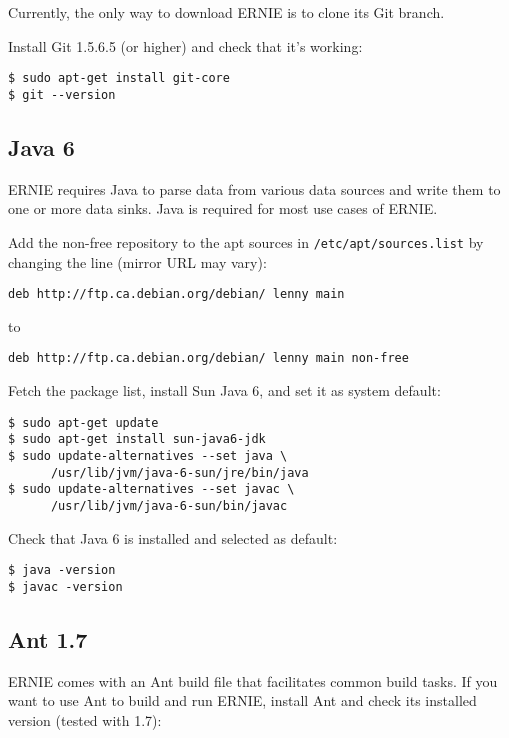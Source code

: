 \documentclass{article}
\begin{document}
Currently, the only way to download ERNIE is to clone its Git branch.

Install Git 1.5.6.5 (or higher) and check that it's working:

\begin{verbatim}
$ sudo apt-get install git-core
$ git --version
\end{verbatim}

\subsection{Java 6}

ERNIE requires Java to parse data from various data sources and write them
to one or more data sinks. Java is required for most use cases of ERNIE.

Add the non-free repository to the apt sources in
\verb+/etc/apt/sources.list+ by changing the line (mirror URL may vary):

\begin{verbatim}
deb http://ftp.ca.debian.org/debian/ lenny main
\end{verbatim}

to

\begin{verbatim}
deb http://ftp.ca.debian.org/debian/ lenny main non-free
\end{verbatim}

Fetch the package list, install Sun Java 6, and set it as system default:

\begin{verbatim}
$ sudo apt-get update
$ sudo apt-get install sun-java6-jdk
$ sudo update-alternatives --set java \
      /usr/lib/jvm/java-6-sun/jre/bin/java
$ sudo update-alternatives --set javac \
      /usr/lib/jvm/java-6-sun/bin/javac
\end{verbatim}

Check that Java 6 is installed and selected as default:

\begin{verbatim}
$ java -version
$ javac -version
\end{verbatim}

\subsection{Ant 1.7}

ERNIE comes with an Ant build file that facilitates common build tasks.
If you want to use Ant to build and run ERNIE, install Ant and check its
installed version (tested with 1.7):
\end{document}
